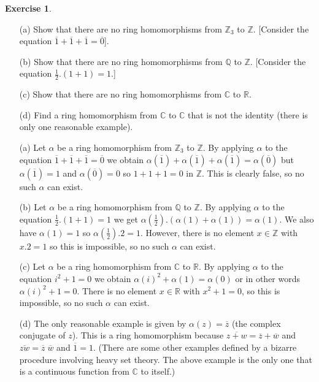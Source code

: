 \documentclass{amsart}
\newcommand{\C}         {{\mathbb{C}}}
\newcommand{\Q}         {{\mathbb{Q}}}
\newcommand{\R}         {{\mathbb{R}}}
\newcommand{\Z}         {{\mathbb{Z}}}
\newcommand{\al}        {\alpha}
\newcommand{\ov}[1]     {\overline{#1}}
\newcommand{\ip}[1]     {\langle #1\rangle}
\newcommand{\half}      {{\textstyle\frac{1}{2}}}
\renewcommand{\:}{\colon}
\theoremstyle{definition}
\newtheorem{exercise}{Exercise}[section]
\renewenvironment{solution}{\SolutionAtEnd}{\endSolutionAtEnd}
\begin{document}
\begin{exercise}
 \begin{itemize}
  \item[(a)] Show that there are no ring homomorphisms
   from $\Z_3$ to $\Z$.  [Consider the equation
   $\ov{1}+\ov{1}+\ov{1}=\ov{0}$]. 
  \item[(b)] Show that there are no ring homomorphisms from $\Q$ to
   $\Z$.  [Consider the equation $\half.(1+1)=1$.]
  \item[(c)] Show that there are no ring homomorphisms from $\C$ to
   $\R$.
  \item[(d)] Find a ring homomorphism from $\C$ to $\C$ that is not
   the identity (there is only one reasonable example).
 \end{itemize}
\end{exercise}
\begin{solution}
 \begin{itemize}
  \item[(a)] Let $\al$ be a ring homomorphism from $\Z_3$ to $\Z$.  By
   applying $\al$ to the equation $\ov{1}+\ov{1}+\ov{1}=\ov{0}$ we
   obtain $\al(\ov{1})+\al(\ov{1})+\al(\ov{1})=\al(\ov{0})$ but
   $\al(\ov{1})=1$ and $\al(\ov{0})=0$ so $1+1+1=0$ in $\Z$.  This is
   clearly false, so no such $\al$ can exist. 
  \item[(b)] Let $\al$ be a ring homomorphism from $\Q$ to $\Z$.  By
   applying $\al$ to the equation $\half.(1+1)=1$ we get
   $\al(\half).(\al(1)+\al(1))=\al(1)$.  We also have $\al(1)=1$ so
   $\al(\half).2=1$.  However, there is no element $x\in\Z$ with
   $x.2=1$ so this is impossible, so no such $\al$ can exist.
  \item[(c)] Let $\al$ be a ring homomorphism from $\C$ to $\R$.  By
   applying $\al$ to the equation $i^2+1=0$ we obtain
   $\al(i)^2+\al(1)=\al(0)$ or in other words $\al(i)^2+1=0$.  There
   is no element $x\in\R$ with $x^2+1=0$, so this is impossible, so no
   such $\al$ can exist.
  \item[(d)] The only reasonable example is given by $\al(z)=\ov{z}$
   (the complex conjugate of $z$).  This is a ring homomorphism
   because $\ov{z+w}=\ov{z}+\ov{w}$ and $\ov{zw}=\ov{z}\;\ov{w}$ and
   $\ov{1}=1$.  (There are some other examples defined by a bizarre
   procedure involving heavy set theory.  The above example is the
   only one that is a continuous function from $\C$ to itself.)
 \end{itemize}
\end{solution}
\end{document}
